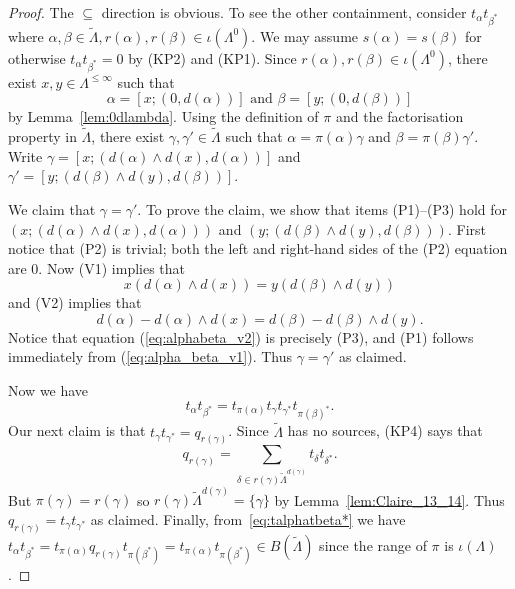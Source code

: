\documentclass[a4paper,12pt]{amsart}
\numberwithin{equation}{section}
\theoremstyle{definition}
\theoremstyle{remark}
\begin{document}
\begin{proof}
The $\subseteq$ direction is obvious.  To see the other containment,  consider $t_{\alpha}t_{\beta^*}$ where
$\alpha, \beta \in \tilde{\Lambda}, r(\alpha),r(\beta) \in \iota(\Lambda^0)$.  
We may assume $s(\alpha)=s(\beta)$ for otherwise $t_{\alpha}t_{\beta^*} = 0$ by (KP2) and (KP1).  
Since $r(\alpha),r(\beta) \in \iota(\Lambda^0)$, 
there exist $x,y \in \Lambda^{\leq \infty}$ such that
\[
 \alpha = [x;(0,d(\alpha))] \text{ and }
\beta = [y;(0,d(\beta))]
\] by Lemma~\ref{lem:0dlambda}.
Using the definition of $\pi$ and the factorisation property in ${\tilde{\Lambda}}$, there exist
$\gamma,\gamma' \in {\tilde{\Lambda}}$ such that
$\alpha = \pi(\alpha)\gamma$ and $\beta=\pi(\beta)\gamma'$. Write  
$\gamma = [x;(d(\alpha) \wedge d(x), d(\alpha))]$ and 
$\gamma' = [y; (d(\beta) \wedge d(y),d(\beta))]$.

We claim that $\gamma = \gamma'.$ 
To prove the claim, we show that  items (P1)--(P3) hold for $(x;(d(\alpha) \wedge d(x), d(\alpha)))$ 
and $(y; (d(\beta) \wedge d(y),d(\beta)))$.
First notice that (P2) is trivial; both the left and right-hand
 sides of the (P2) equation are 0.
 Now (V1) implies that
\begin{equation}
 \label{eq:alpha_beta_v1}
x(d(\alpha) \wedge d(x)) = y(d(\beta) \wedge d(y))
\end{equation}
and (V2) implies that
\begin{equation}
 \label{eq:alphabeta_v2}
d(\alpha)-d(\alpha) \wedge d(x) = d(\beta) -d(\beta) \wedge d(y).
\end{equation}
Notice that equation (\ref{eq:alphabeta_v2}) is precisely 
(P3), and (P1) follows immediately from (\ref{eq:alpha_beta_v1}).  Thus $\gamma=\gamma'$
 as claimed.  

Now we have 
\begin{equation}\label{eq:talphatbeta*}
t_{\alpha}t_{\beta^*} = t_{\pi(\alpha)}t_{\gamma}t_{\gamma^*}t_{\pi(\beta)^*}.
\end{equation}
Our next claim is  that
$t_{\gamma}t_{\gamma^*} = q_{r(\gamma)}$.
Since ${\tilde{\Lambda}}$ has no sources, (KP4) says  that 
\[q_{r(\gamma) } = \sum_{\delta \in r(\gamma)  {\tilde{\Lambda}}^{d(\gamma)}} t_{\delta}t_{\delta^*}.\]
But $\pi(\gamma)=r(\gamma)$  so  
$r(\gamma){\tilde{\Lambda}}^{d(\gamma)} = \{\gamma\}$
by Lemma~\ref{lem:Claire_13_14}.
Thus $q_{r(\gamma)} = t_{\gamma}t_{\gamma^*}$ as claimed. 
Finally, from~\eqref{eq:talphatbeta*}
we have 
$t_{\alpha}t_{\beta^*} = t_{\pi(\alpha)}q_{r(\gamma)} t_{\pi(\beta^*)} =  
t_{\pi(\alpha)} t_{\pi(\beta^*)}\in B(\tilde\Lambda)$  since the range of $\pi$ is $\iota(\Lambda)$. 
\end{proof}
\end{document}
